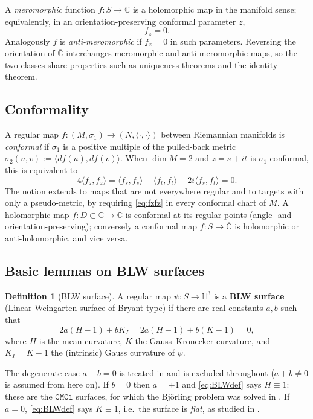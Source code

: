 \documentclass[11pt,a4paper]{article}
\newcommand{\CC}{\mathbb{C}}
\newcommand{\Cbar}{\overline{\mathbb{C}}}           %
\newcommand{\Hyp}{\mathbb{H}^3}                      %
\newcommand{\ip}[2]{\langle #1,#2\rangle}            %
\theoremstyle{plain}
\theoremstyle{definition}
\newtheorem{definition}[theorem]{Definition}
\theoremstyle{remark}
\begin{document}
A \emph{meromorphic} function $f:S\to\Cbar$ is a holomorphic map in the
manifold sense; equivalently, in an orientation-preserving conformal
parameter $z$,
\begin{equation}\label{eq:meromorphic}
  f_{\bar z} = 0.
\end{equation}
Analogously $f$ is \emph{anti-meromorphic} if $f_z=0$ in such parameters.
Reversing the orientation of $\Cbar$ interchanges meromorphic and
anti-meromorphic maps, so the two classes share properties such as
uniqueness theorems and the identity theorem.

\subsection{Conformality}

A regular map $f:(M,\sigma_1)\to(N,\ip\cdot\cdot)$ between Riemannian
manifolds is \emph{conformal} if $\sigma_1$ is a positive multiple of the
pulled-back metric $\sigma_2(u,v):=\ip{df(u)}{df(v)}$. When $\dim M=2$
and $z=s+it$ is $\sigma_1$-conformal, this is equivalent to
\begin{equation}\label{eq:fzfz}
  4\ip{f_z}{f_z} = \ip{f_s}{f_s}-\ip{f_t}{f_t}-2i\ip{f_s}{f_t}=0 .
\end{equation}
The notion extends to maps that are not everywhere regular and to targets
with only a pseudo-metric, by requiring \eqref{eq:fzfz} in every conformal
chart of $M$. A holomorphic map $f:D\subset\CC\to\CC$ is conformal at its
regular points (angle- and orientation-preserving); conversely a conformal
map $f:S\to\Cbar$ is holomorphic or anti-holomorphic, and vice versa.

\subsection{Basic lemmas on BLW surfaces}\label{ssec:BLWbasic}

\begin{definition}[BLW surface]\label{def:BLW}
A regular map $\psi:S\to\Hyp$ is a \textbf{BLW surface} (Linear Weingarten
surface of Bryant type) if there are real constants $a,b$ such that
\begin{equation}\label{eq:BLWdef}
  2a(H-1)+bK_I = 2a(H-1)+b(K-1) = 0,
\end{equation}
where $H$ is the mean curvature, $K$ the Gauss--Kronecker curvature, and
$K_I=K-1$ the (intrinsic) Gauss curvature of $\psi$.
\end{definition}

The degenerate case $a+b=0$ is treated in \cite{MAGIC} and is excluded
throughout ($a+b\neq0$ is assumed from here on). If $b=0$ then $a=\pm1$
and \eqref{eq:BLWdef} says $H\equiv1$: these are the $\mathtt{CMC1}$
surfaces, for which the Björling problem was solved in \cite{GMM1}. If
$a=0$, \eqref{eq:BLWdef} says $K\equiv1$, i.e.\ the surface is
\emph{flat}, as studied in \cite{GMM5}.
\end{document}
